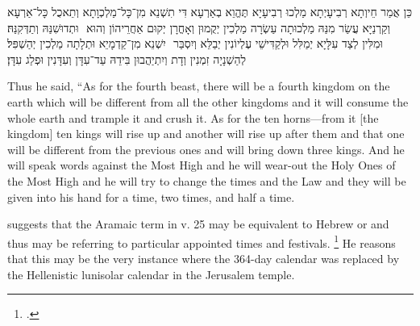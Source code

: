 \begin{aramaictranslation}
    ‏כֵּן אֲמַר חֵיוְתָא רְבִיעָיְתָא מַלְכוּ רְבִיעָיָא תֶּהֱוֵא בְאַרְעָא דִּי תִשְׁנֵא מִן־כָּל־מַלְכְוָתָא וְתֵאכֻל כָּל־אַרְעָא וּתְדוּשִׁנַּהּ וְתַדְּקִנַּהּ׃ ‎
    ‏ וְקַרְנַיָּא עֲשַׂר מִנַּהּ מַלְכוּתָה עַשְׂרָה מַלְכִין יְקֻמוּן וְאָחֳרָן יְקוּם אַחֲרֵיהוֹן וְהוּא יִשְׁנֵא מִן־קַדְמָיֵא וּתְלָתָה מַלְכִין יְהַשְׁפִּל׃ ‎
    ‏ וּמִלִּין לְצַד עִלָּיָא יְמַלִּל וּלְקַדִּישֵׁי עֶלְיוֹנִין יְבַלֵּא וְיִסְבַּר לְהַשְׁנָיָה זִמְנִין וְדָת וְיִתְיַהֲבוּן בִּידֵהּ עַד־עִדָּן וְעִדָּנִין וּפְלַג עִדָּן׃
\end{aramaictranslation}

\begin{translation}
    Thus he said, ``As for the fourth beast, there will be a fourth kingdom on the earth which will be different from all the other kingdoms and it will consume the whole earth and trample it and crush it.
    As for the ten horns---from it [the kingdom] ten kings will rise up and another will rise up after them and that one will be different from the previous ones and will bring down three kings.
    And he will speak words against the Most High and he will wear-out the Holy Ones of the Most High and he will try to change the times and the Law and they will be given into his hand for a time, two times, and half a time.
\end{translation}

\noindent
\vanderkam suggests that the Aramaic term  in v. 25 may be equivalent to Hebrew  or  and thus may be referring to particular appointed times and festivals.%
    \footnote{\cite[59--60]{vanderkam_jsj1981}.}
He reasons that this may be the very instance where the 364-day calendar was replaced by the Hellenistic lunisolar calendar in the Jerusalem temple.


